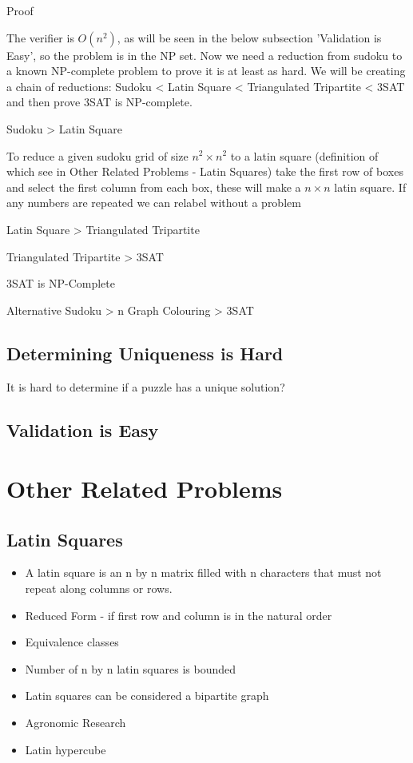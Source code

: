 \documentclass[a4paper,12pt]{article}
\begin{document}
		Proof

		The verifier is $O(n^2)$, as will be seen in the below subsection 'Validation is Easy', so the problem is in the NP set. Now we need a reduction from sudoku to a known NP-complete problem to prove it is at least as hard. We will be creating a chain of reductions: Sudoku < Latin Square < Triangulated Tripartite < 3SAT and then prove 3SAT is NP-complete.

		Sudoku > Latin Square

		To reduce a given sudoku grid of size $n^2 \times n^2$ to a latin square (definition of which see in Other Related Problems - Latin Squares) take the first row of boxes and select the first column from each box, these will make a $n \times n$ latin square. If any numbers are repeated we can relabel without a problem 

		Latin Square > Triangulated Tripartite

		Triangulated Tripartite > 3SAT

		3SAT is NP-Complete

		Alternative Sudoku > n Graph Colouring > 3SAT

	\subsection{Determining Uniqueness is Hard}

		It is hard to determine if a puzzle has a unique solution?
		
	\subsection{Validation is Easy}
\section{Other Related Problems}
	\subsection{Latin Squares}

		\begin{itemize}
		\item{A latin square is an n by n matrix filled with n characters that must not repeat along columns or rows.}
		\item{Reduced Form -  if first row and column is in the natural order}
		\item{Equivalence classes}
		\item{Number of n by n latin squares is bounded}
		\item{Latin squares can be considered a bipartite graph}
		\item{Agronomic Research}
		\item{Latin hypercube}
		\end{itemize}
\end{document}
